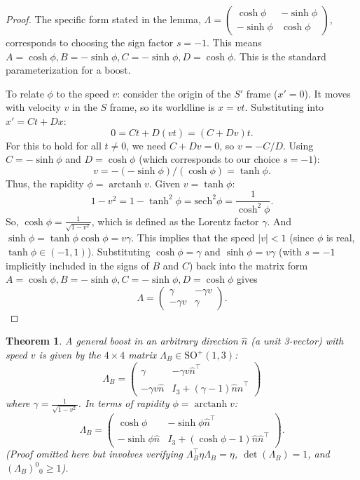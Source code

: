 \documentclass{amsart}
\newtheorem{theorem}{Theorem}[section]
\theoremstyle{definition}
\theoremstyle{remark}
\DeclareMathOperator{\arctanh}{arctanh}
\begin{document}
\begin{proof}
  The specific form stated in the lemma, $\Lambda = \begin{pmatrix} \cosh\phi & -\sinh\phi \\ -\sinh\phi & \cosh\phi \end{pmatrix}$, corresponds to choosing the sign factor $s=-1$.
  This means $A = \cosh\phi, B = -\sinh\phi, C = -\sinh\phi, D = \cosh\phi$. This is the standard parameterization for a boost.

  To relate $\phi$ to the speed $v$: consider the origin of the $S'$ frame ($x'=0$). It moves with velocity $v$ in the $S$ frame, so its worldline is $x=vt$.
  Substituting into $x' = C t + D x$:
  \[ 0 = C t + D (vt) = (C + Dv)t. \]
  For this to hold for all $t \neq 0$, we need $C+Dv=0$, so $v = -C/D$.
  Using $C = -\sinh\phi$ and $D = \cosh\phi$ (which corresponds to our choice $s=-1$):
  \[ v = -(-\sinh\phi) / (\cosh\phi) = \tanh\phi. \]
  Thus, the rapidity $\phi = \arctanh v$.
  Given $v = \tanh\phi$:
  \[ 1 - v^2 = 1 - \tanh^2\phi = \mathrm{sech}^2\phi = \frac{1}{\cosh^2\phi}. \]
  So, $\cosh\phi = \frac{1}{\sqrt{1-v^2}}$, which is defined as the Lorentz factor $\gamma$.
  And $\sinh\phi = \tanh\phi \cosh\phi = v\gamma$.
  This implies that the speed $|v| < 1$ (since $\phi$ is real, $\tanh\phi \in (-1,1)$).
  Substituting $\cosh\phi = \gamma$ and $\sinh\phi = v\gamma$ (with $s=-1$ implicitly included in the signs of $B$ and $C$) back into the matrix form $A=\cosh\phi, B=-\sinh\phi, C=-\sinh\phi, D=\cosh\phi$ gives
  \[
  \Lambda =
  \begin{pmatrix}
    \gamma & -\gamma v \\
    -\gamma v & \gamma
  \end{pmatrix}.
  \]
\end{proof}

\begin{theorem}\label{thm:general_boost_so13}
  A general boost in an arbitrary direction $\hat{n}$ (a unit 3-vector) with speed $v$ is given by the $4 \times 4$ matrix $\Lambda_B \in \mathrm{SO}^+(1,3)$:
  \[
  \Lambda_B =
  \begin{pmatrix}
    \gamma & -\gamma v \hat{n}^\top \\
    -\gamma v \hat{n} & I_3 + \left(\gamma-1\right)\hat{n}\hat{n}^\top
  \end{pmatrix}
  \]
  where $\gamma=\frac{1}{\sqrt{1-v^2}}$. In terms of rapidity $\phi=\arctanh v$:
  \[
  \Lambda_B =
  \begin{pmatrix}
    \cosh \phi & -\sinh \phi \hat{n}^\top \\
    -\sinh \phi \hat{n} & I_3 + (\cosh \phi - 1) \hat{n} \hat{n}^\top
  \end{pmatrix}.
  \]
  (Proof omitted here but involves verifying $\Lambda_B^\top \eta \Lambda_B = \eta$, $\det(\Lambda_B)=1$, and $(\Lambda_B)^0{}_0 \ge 1$).
\end{theorem}
\end{document}
